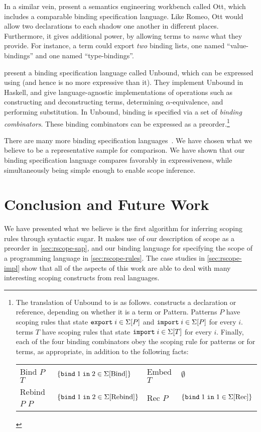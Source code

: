 In a similar vein, \cite{sewell-ott-jfp} present a semantics engineering
workbench called Ott, which includes a comparable binding
specification language. Like Romeo, Ott would allow two declarations
to each shadow one another in different places. Furthermore, it gives
additional power, by allowing terms to \emph{name} what they provide.
For instance, a term could export \emph{two} binding lists, one named
``value-bindings'' and one named ``type-bindings''.

\cite{weirich-scope} present a binding specification language called
Unbound, which can be expressed using {\sap} (and
hence is no more expressive than it).
They implement Unbound in Haskell, and give language-agnostic
implementations of operations such as constructing and deconstructing
terms, determining $\alpha$-equivalence, and performing substitution.
In Unbound, binding is specified via a set of \emph{binding combinators}.
  These binding combinators can be expressed as a preorder.\footnote{
  The translation of Unbound to {\sap} is as follows. 
  constructs a declaration or reference, depending on whether it is a
  term or Pattern. Patterns $P$ have scoping rules that state
  $\SigPExpt{i}$ and $\SigPImpt{i}$ for every $i$. terms $T$ have
  scoping rules that state $\SigImpt{T}{i}$ for every $i$. Finally,
  each of the four binding combinators obey the scoping rule for
  patterns or for terms, as appropriate, in addition to the following
  facts:
  \begin{center}
  \begin{tabular}{l l @{\quad} l l}
    Bind $P$ $T$   & $\{\SigBind{\text{Bind}}{2}{1}\}$ &
    Embed $T$      & $\emptyset$ \\
    Rebind $P$ $P$ & $\{\SigBind{\text{Rebind}}{2}{1}\}$ &
    Rec $P$        & $\{\SigBind{\text{Rec}}{1}{1}\}$
  \end{tabular}
  \end{center}
}

There are many more binding specification
languages~\cite{aczel-church-rosser,pottier-caml,nabl}.
We have chosen what we believe to be a representative sample for
comparison. We have shown that our binding specification language
compares favorably in expressiveness, while simultaneously being
simple enough to enable scope inference.

\section{Conclusion and Future Work}
We have presented what we believe is the first algorithm for
inferring scoping rules through syntactic sugar. It makes use
of our description of scope as a preorder in
\cref{sec:rscope-sap}, and our binding language for specifying the
scope of a programming language in \cref{sec:rscope-rules}. The case studies
in \cref{sec:rscope-impl} show that all of the aspects of this work
are able to deal with many interesting scoping constructs from real
languages.

